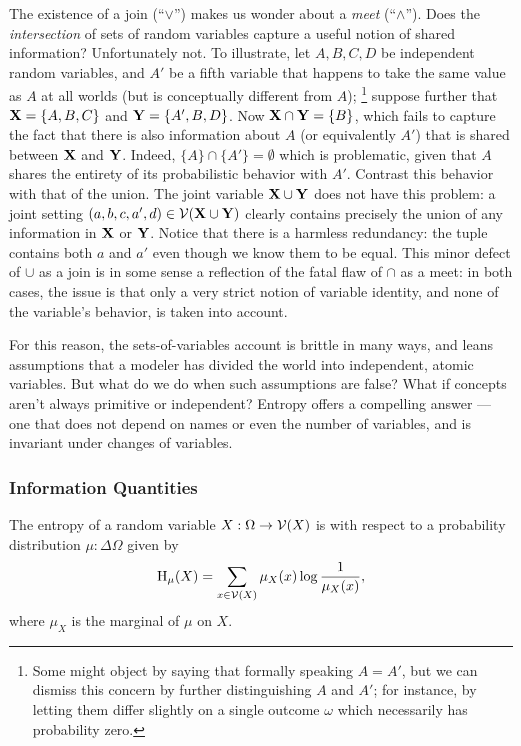 \documentclass{article}
\begin{document}
    The existence of a join (``$\lor$'') makes us wonder about a \emph{meet} (``$\land$''). Does the \emph{intersection} of sets of random variables capture a useful notion of shared information? Unfortunately not.
    To illustrate, let $A, B, C, D$ be independent random variables, and $A'$ be a fifth variable that happens to take the same value as $A$ at all worlds (but is conceptually different from $A$);%
        \footnote{Some might object by saying that formally speaking $A = A'$, but we can dismiss this concern by further distinguishing $A$ and $A'$; for instance, by letting them differ slightly on a single outcome $\omega$ which necessarily has probability zero.}
    suppose further that $\mathbf X = \{A,B,C\}$ and $\mathbf Y = \{A', B, D\}$. Now $\mathbf X \cap \mathbf Y = \{B\}$, which fails to capture the fact that there is also information about $A$ (or equivalently $A'$) that is shared between $\mathbf X$ and $\mathbf Y$. Indeed, $\{A\} \cap \{A'\} = \emptyset$ which is problematic, given that $A$ shares the entirety of its probabilistic behavior with $A'$.
    Contrast this behavior with that of the union.  The joint variable $\mathbf X \cup \mathbf Y$ does not have this problem: a joint setting $(a,b,c,a',d) \in \mathcal V(\mathbf X \cup \mathbf Y)$ clearly contains precisely the union of any information in $\mathbf X$ or $\mathbf Y$. Notice that there is a harmless redundancy: the tuple contains both $a$ and $a'$ even though we know them to be equal. This minor defect of $\cup$ as a join is in some sense a reflection of the fatal flaw of $\cap$ as a meet: in both cases, the issue is that only a very strict notion of variable identity, and none of the variable's behavior, is taken into account.

    For this reason, the sets-of-variables account is brittle in many ways, and leans assumptions that a modeler has divided the world into independent, atomic variables. But what do we do when such assumptions are false? What if concepts aren't always primitive or independent? Entropy offers a compelling answer --- one that does not depend on names or even the number of variables, and is invariant under changes of variables.

    \subsubsection{Information Quantities}

    \begin{defn}\label{def:entropy}
        The entropy of a random variable $X : \Omega \to \mathcal V(X)$ is with respect to a probability distribution $\mu : \Delta \Omega$ given by
        \[ \operatorname{\mathrm{H}}_\mu(X) = \sum_{x \in \mathcal V(X)} \mu_X(x) \log \frac{1}{\mu_X(x)} ,\]
        where $\mu_X$ is the marginal of $\mu$ on $X$.
    \end{defn}
\end{document}
